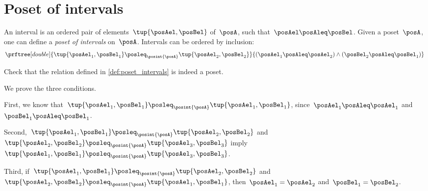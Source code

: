 \section{Poset of intervals}
\begin{definition}
  \label{def:poset_intervals}
  An interval is an ordered pair of elements~$\tup{\posAel,\posBel}$ of~$\posA$, such that~$\posAel \posAleq \posBel$. Given a poset~$\posA$, one can define a \emph{poset of intervals} on~$\posA$.
  Intervals can be ordered by inclusion:
  \begin{equation}
    \prftree[double]{\tup{\posAel_1,\posBel_1}\posleq_{\posint{\posA}}\tup{\posAel_2,\posBel_2} }{ (\posAel_1\posAleq \posAel_2)\wedge (\posBel_2\posAleq \posBel_1)}
  \end{equation}
\end{definition}

\begin{exercise}
Check that the relation defined in \cref{def:poset_intervals} is indeed a poset.
\end{exercise}
\begin{solution}
  We prove the three conditions.
  \begin{compactitem}
    \item First, we know that~$\tup{\posAel_1,\posBel_1}\posleq_{\posint{\posA}}\tup{\posAel_1,\posBel_1}$, since~$\posAel_1\posAleq \posAel_1$ and~$\posBel_1\posAleq \posBel_1$.
    \item Second,~$\tup{\posAel_1,\posBel_1}\posleq_{\posint{\posA}}\tup{\posAel_2,\posBel_2}$ and~$\tup{\posAel_2,\posBel_2}\posleq_{\posint{\posA}}\tup{\posAel_3,\posBel_3}$ imply~$\tup{\posAel_1,\posBel_1}\posleq_{\posint{\posA}}\tup{\posAel_3,\posBel_3}$.
    \item Third, if~$\tup{\posAel_1,\posBel_1}\posleq_{\posint{\posA}}\tup{\posAel_2,\posBel_2}$ and~$\tup{\posAel_2,\posBel_2}\posleq_{\posint{\posA}}\tup{\posAel_1,\posBel_1}$, then~$\posAel_1=\posAel_2$ and~$\posBel_1=\posBel_2$.
  \end{compactitem}
\end{solution}


